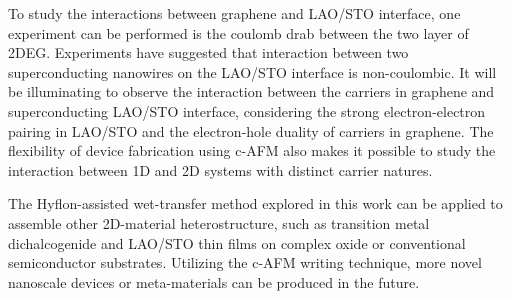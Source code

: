 \documentclass[pdflatex, sectionletters, 12pt]{pittetd}    %
\begin{document}
To study the interactions between graphene and LAO/STO interface, one experiment can be performed is the coulomb drab between the two layer of 2DEG. Experiments have suggested that interaction between two superconducting nanowires on the LAO/STO interface is non-coulombic\cite{tang2017non}. It will be illuminating to observe the interaction between the carriers in graphene and superconducting LAO/STO interface, considering the strong electron-electron pairing in LAO/STO and the electron-hole duality of carriers in graphene. The flexibility of device fabrication using c-AFM also makes it possible to study the interaction between 1D and 2D systems with distinct carrier natures.

The Hyflon-assisted wet-transfer method explored in this work can be applied to assemble other 2D-material heterostructure, such as transition metal dichalcogenide and LAO/STO thin films on complex oxide or conventional semiconductor substrates. Utilizing the c-AFM writing technique, more novel nanoscale devices or meta-materials can be produced in the future.

%
%

% 

\end{document}
